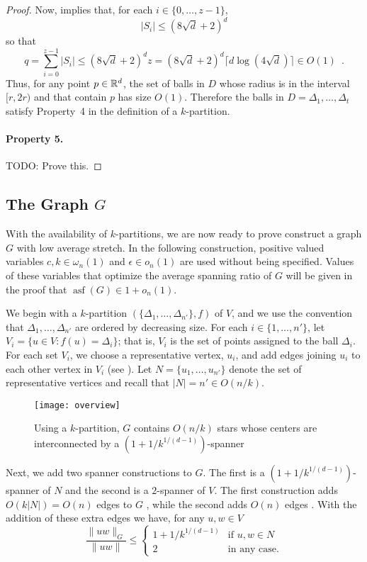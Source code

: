 \documentclass{patmorin}
\DeclareMathOperator{\asf}{asf}
\begin{document}
\begin{proof}
  Now,  implies that, for each $i\in\{0,\ldots,z-1\}$, 
  \[
     |S_i|\le (8\sqrt{d}+2)^d
  \]
  so that
  \[
     q = \sum_{i=0}^{z-1}|S_i|\le (8\sqrt{d}+2)^dz = (8\sqrt{d}+2)^d\lceil d\log(4\sqrt{d})\rceil  \in O(1) \enspace .
  \]
  Thus, for any point $p\in\mathbb{R}^d$, the set of balls in $D$ whose radius
  is in the interval $[r,2r)$ and that contain $p$ has size $O(1)$.
  Therefore the balls in $D=\Delta_1,\ldots,\Delta_t$ satisfy Property~4
  in the definition of a $k$-partition.

  \paragraph{Property 5.}
  TODO: Prove this.
\end{proof}

\subsection{The Graph $G$}

With the availability of $k$-partitions, we are now ready to prove
construct a graph $G$ with low average stretch.  In the following
construction, positive valued variables $c,k\in\omega_n(1)$ and
$\epsilon\in o_n(1)$ are used without being specified.  Values of these
variables that optimize the average spanning ratio of $G$ will be given
in the proof that $\asf(G)\in 1+o_n(1)$.

We begin with a $k$-partition $(\{\Delta_1,\ldots,\Delta_{n'}\},f)$
of $V$, and we use the convention that $\Delta_1,\ldots,\Delta_{n'}$
are ordered by decreasing size.  For each $i\in \{1,\ldots,n'\}$,
let $V_i=\{u\in V : f(u)=\Delta_i\}$; that is, $V_i$ is the set of
points assigned to the ball $\Delta_i$.  For each set $V_i$, we choose a
representative vertex, $u_i$, and add edges joining $u_i$ to each other
vertex in $V_i$ (see ). Let $N=\{u_1,\ldots,u_{n'}\}$
denote the set of representative vertices and recall that $|N|=n'\in
O(n/k)$.

\begin{figure}
  \begin{center} 
    \texttt{[image: overview]}
  \end{center} 
  \caption{Using a $k$-partition, $G$ contains $O(n/k)$ stars whose
    centers are interconnected by a $(1+1/k^{1/(d-1)})$-spanner}
\end{figure}

Next, we add two spanner constructions to $G$.  The first is a
$(1+1/k^{1/(d-1)})$-spanner of $N$ and the second is a $2$-spanner
of $V$.  The first construction adds $O(k|N|)=O(n)$ edges to $G$
\cite[Section~5.5]{narasimhan.smid:geometric}, while the second adds
$O(n)$ edges \cite{x,ys,ss}.  With the addition of these extra edges we
have, for any $u,w\in V$
\[
   \frac{\|uw\|_G}{\|uw\|} \le \begin{cases}
         1+1/k^{1/(d-1)} & \text{if $u,w\in N$} \\
         2 & \text{in any case.}
       \end{cases}
\]
\end{document}
